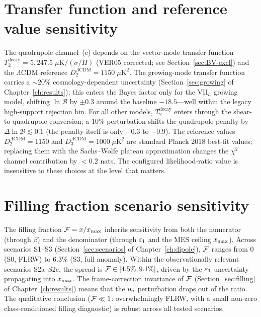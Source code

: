 \section{Transfer function and reference value sensitivity}
\label{sec:tf-robust}

The quadrupole channel~(e) depends on the vector-mode transfer
function $T_2^{\mathrm{decay}} = 5{,}247.5\;\mu\mathrm{K}/(\sigma/H)$ (VER05 corrected; see Section~\ref{sec:BV-excl}) and the
$\Lambda$CDM reference $D_2^{\Lambda\mathrm{CDM}} = 1150\;
\mu\mathrm{K}^2$.  The growing-mode transfer function carries a
$\sim\!20\%$ cosmology-dependent uncertainty (Section~\ref{sec:growing}
of Chapter~\ref{ch:results}); this enters the Bayes factor only
for the VII$_h$ growing model, shifting $\ln\mathcal{B}$ by
$\pm 0.3$ around the baseline $-18.5$---well within the legacy
high-support rejection bin.  For all other models, $T_2^{\mathrm{decay}}$
enters through the shear-to-quadrupole conversion; a $10\%$
perturbation shifts the quadrupole penalty by $\Delta\ln\mathcal{B}
\lesssim 0.1$ (the penalty itself is only $-0.3$ to $-0.9$).
The reference values $D_2^{\Lambda\mathrm{CDM}} = 1150$ and
$D_3^{\Lambda\mathrm{CDM}} = 1000\;\mu\mathrm{K}^2$ are
standard Planck 2018 best-fit values; replacing them with the
Sachs--Wolfe plateau approximation changes the $\chi^2$ channel
contribution by $< 0.2$ nats.  The configured likelihood-ratio value is insensitive to
these choices at the level that matters.


\section{Filling fraction scenario sensitivity}
\label{sec:ff-robust}

The filling fraction $\mathcal{F} = x/x_{\max}$ inherits sensitivity from
both the numerator (through $\beta$) and the denominator (through
$\varepsilon_1$ and the MES ceiling $x_{\max}$).  Across scenarios
S1--S3 (Section~\ref{sec:scenarios} of
Chapter~\ref{ch:dipole}), $\mathcal{F}$ ranges from $0$ (S0, FLRW) to
$6.3\%$ (S3, full anomaly).  Within the observationally relevant
scenarios S2a--S2c, the spread is $\mathcal{F} \in [4.5\%, 9.1\%]$,
driven by the $\varepsilon_1$ uncertainty propagating into $x_{\max}$.
The frame-correction invariance of $\mathcal{F}$
(Section~\ref{sec:filling} of
Chapter~\ref{ch:results}) means that the
$\eta_{\dot{u}}$ perturbation drops out of the ratio.  The qualitative
conclusion ($\mathcal{F} \ll 1$: overwhelmingly FLRW, with a small
non-zero class-conditioned filling diagnostic) is robust across
all tested scenarios.


